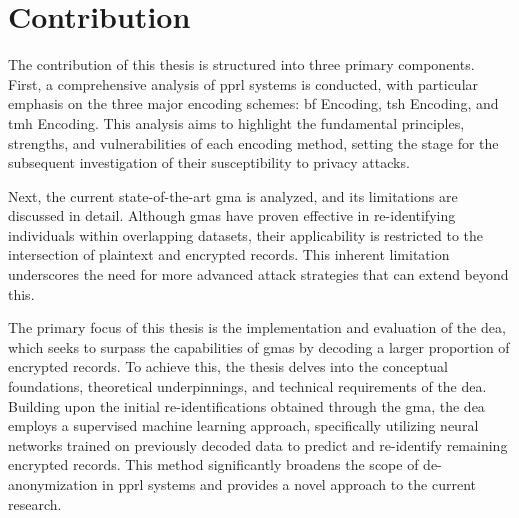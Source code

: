 





\section{Contribution}  \label{sec:contribution}

The contribution of this thesis is structured into three primary components. 
First, a comprehensive analysis of \ac{pprl} systems is conducted, with particular emphasis on the three major encoding schemes: \ac{bf} Encoding, \ac{tsh} Encoding, and \ac{tmh} Encoding. 
This analysis aims to highlight the fundamental principles, strengths, and vulnerabilities of each encoding method, setting the stage for the subsequent investigation of their susceptibility to privacy attacks.

Next, the current state-of-the-art \ac{gma} is analyzed, and its limitations are discussed in detail. 
Although \ac{gma}s have proven effective in re-identifying individuals within overlapping datasets, their applicability is restricted to the intersection of plaintext and encrypted records. 
This inherent limitation underscores the need for more advanced attack strategies that can extend beyond this.

The primary focus of this thesis is the implementation and evaluation of the \ac{dea}, which seeks to surpass the capabilities of \ac{gma}s by decoding a larger proportion of encrypted records. 
To achieve this, the thesis delves into the conceptual foundations, theoretical underpinnings, and technical requirements of the \ac{dea}. 
Building upon the initial re-identifications obtained through the \ac{gma}, the \ac{dea} employs a supervised machine learning approach, specifically utilizing neural networks trained on previously decoded data to predict and re-identify remaining encrypted records. 
This method significantly broadens the scope of de-anonymization in \ac{pprl} systems and provides a novel approach to the current research.

